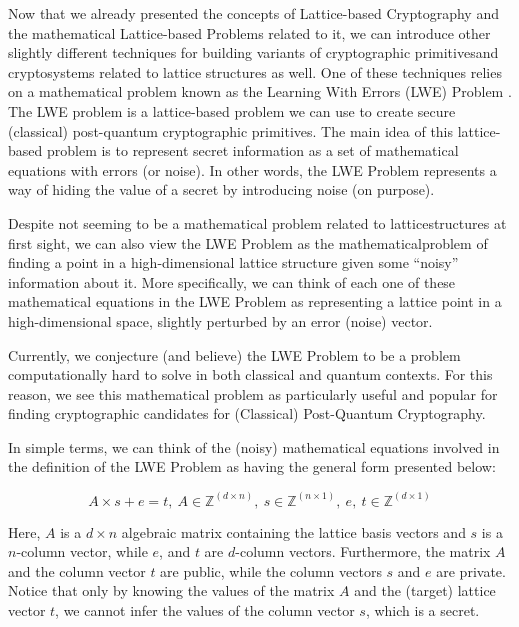 \documentclass[runningheads]{llncs}
\numberwithin{equation}{section}
\begin{document}
    Now that we already presented the concepts of Lattice-based Cryptography and the mathematical Lattice-based Problems related to it, we can introduce other slightly different techniques for building variants of cryptographic primitives\break and cryptosystems related to lattice structures as well. One of these techniques relies on a mathematical problem known as the Learning With Errors (LWE) Problem \cite{regev:on-lattices-learning-with-errors-random-linear-codes-and-cryptography:2005:06-2024,lyubashevsky-peikert-regev:ideal-lattices-and-learning-with-errors-over-rings:2013:06-2024}. The LWE problem is a lattice-based problem we can use to create secure (classical) post-quantum cryptographic primitives. The main idea of this lattice-based problem is to represent secret information as a set of mathematical equations with errors (or noise). In other words, the LWE Problem represents a way of hiding the value of a secret by introducing noise (on purpose).

    Despite not seeming to be a mathematical problem related to lattice\break structures at first sight, we can also view the LWE Problem as the mathematical\break problem of finding a point in a high-dimensional lattice structure given some ``noisy'' information about it. More specifically, we can think of each one of these mathematical equations in the LWE Problem as representing a lattice point in a high-dimensional space, slightly perturbed by an error (noise) vector.
    
    Currently, we conjecture (and believe) the LWE Problem to be a problem computationally hard to solve in both classical and quantum contexts. For this reason, we see this mathematical problem as particularly useful and popular for finding cryptographic candidates for (Classical) Post-Quantum Cryptography.

    \vspace{2ex}

    \noindent In simple terms, we can think of the (noisy) mathematical equations involved in the definition of the LWE Problem as having the general form presented below:

    $$ A \times s + e = t,\ A \in {\mathbb{Z}}^{(d \times n)},\ s \in {\mathbb{Z}}^{(n \times 1)},\ e,\ t \in {\mathbb{Z}}^{(d \times 1)} $$

    \vspace{1ex}

    \noindent Here, $A$ is a $d \times n$ algebraic matrix containing the lattice basis vectors and $s$ is a $n$-column vector, while $e$, and $t$ are $d$-column vectors. Furthermore, the matrix $A$ and the column vector $t$ are public, while the column vectors $s$ and $e$ are private. Notice that only by knowing the values of the matrix $A$ and the (target) lattice vector $t$, we cannot infer the values of the column vector $s$, which is a secret.
\end{document}
